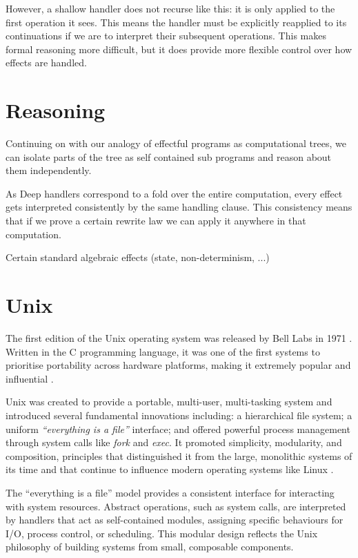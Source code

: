 \documentclass[logo,bsc,singlespacing,parskip]{infthesis}
\begin{document}
However, a shallow handler does not recurse like this: it is only applied to the first operation it sees. This means the handler must be explicitly reapplied to its continuations if we are to interpret their subsequent operations. This makes formal reasoning more difficult, but it does provide more flexible control over how effects are handled.

\section{Reasoning}
Continuing on with our analogy of effectful programs as computational trees, we can isolate parts of the tree as self contained sub programs and reason about them independently. 


As Deep handlers correspond to a fold over the entire computation, every effect gets interpreted consistently by the same handling clause. This consistency means that if we prove a certain rewrite law we can apply it anywhere in that computation. 

Certain standard algebraic effects (state, non-determinism, ...) 

\section{Unix}
The first edition of the Unix operating system was released by Bell Labs in 1971 \cite{ritchie1974unix}. Written in the C programming language, it was one of the first systems to prioritise portability across hardware platforms, making it extremely popular and influential \cite{blair1985critique}.

Unix was created to provide a portable, multi-user, multi-tasking system and introduced several fundamental innovations including: a hierarchical file system; a uniform \textit{“everything is a file”} interface; and offered powerful process management through system calls like \textit{fork} and \textit{exec}.  It promoted simplicity, modularity, and composition, principles that distinguished it from the large, monolithic systems of its time and that continue to influence modern operating systems like Linux \cite{gancarz2003linux}.

The “everything is a file” model provides a consistent interface for interacting with system resources. Abstract operations, such as system calls, are interpreted by handlers that act as self-contained modules, assigning specific behaviours for I/O, process control, or scheduling. This modular design reflects the Unix philosophy\cite{raymond2003art} of building systems from small, composable components.
\end{document}
